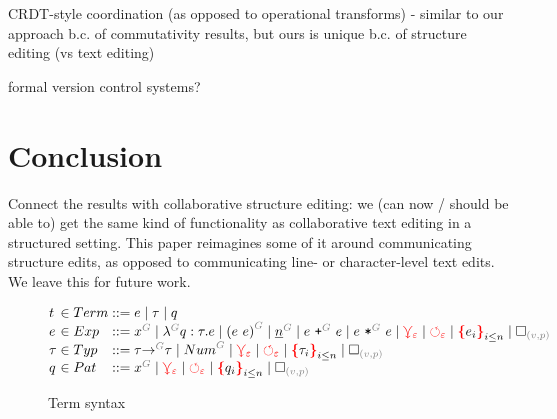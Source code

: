 \documentclass[nonacm, acmsmall, screen, review]{acmart}
\newcommand{\e}{\varepsilon}
\newcommand{\id}[1]{\textcolor{gray}{\ensuremath{#1}}}
\newcommand{\eid}[2]{{#2}^{\id{#1}}}
\newcommand{\conflictHole}[1]{%
{\noexpandarg\StrSubstitute{#1}{,}{\textcolor{red}{\,\textbf{|}\,}}[\myargs]%
{\textcolor{red}{\textbf{\{}}\myargs\textcolor{red}{\textbf{\}}}}}}%
\newcommand{\emptyHole}[2]{\square_{\id{(#1, #2)}}}
\newcommand{\eVar}[2]{\eid{#1}{#2}}
\newcommand{\eFun}[4]{\eid{#1}{\lambda} #2 : #3 . #4}
\newcommand{\eApp}[3]{\eid{#1}{\left(#2~#3\right)}}
\newcommand{\eNum}[2]{\eid{#1}{\underline{#2}}}
\newcommand{\ePlus}[3]{#2~\eid{#1}{\texttt{+}}~#3}
\newcommand{\eTimes}[3]{#2~\eid{#1}{\texttt{*}}~#3}
\newcommand{\pVar}[2]{\eid{#1}{#2}}
\newcommand{\tArrow}[3]{#2 \eid{#1}{\rightarrow} #3}
\newcommand{\tNum}[1]{\eid{#1}{Num}}
\newcommand{\multiVertex}[1]{\textcolor{red}{\ensuremath{\curlyveedownarrow_{#1}}}}
\newcommand{\cycleVertex}[1]{\textcolor{red}{\ensuremath{\circlearrowleft_{#1}}}}
\begin{document}
CRDT-style coordination (as opposed to operational transforms)
- similar to our approach b.c. of commutativity results, but ours is unique b.c. of structure editing (vs text editing)

formal version control systems?


\section{Conclusion}

Connect the results with collaborative structure editing: we (can now / should be able to) get the same kind of functionality as collaborative text editing in a structured setting. 
This paper reimagines some of it around communicating structure edits, as opposed to communicating line- or character-level text edits.
We leave this for future work.



\begin{figure}
  \[
    \arraycolsep=0pt
    \begin{array}{lcllll}
      t & {}\in{} & Term & {}::={} &
        e
        \mid \tau
        \mid q
      \\
      e & {}\in{} & Exp & {}::={} &
        \eVar{G}{x}
        \mid \eFun{G}{q}{\tau}{e}
        \mid \eApp{G}{e}{e}
        \mid \eNum{G}{n}
        \mid \ePlus{G}{e}{e}
        \mid \eTimes{G}{e}{e}
        \mid \multiVertex{\e}
        \mid \cycleVertex{\e}
        \mid \conflictHole{e_i}_{i \leq n}
        \mid \emptyHole{v}{p}
      \\
      \tau & {}\in{} & Typ & {}::={} &
        \tArrow{G}{\tau}{\tau}
        \mid \tNum{G}
        \mid \multiVertex{\e}
        \mid \cycleVertex{\e}
        \mid \conflictHole{\tau_i}_{i \leq n}
        \mid \emptyHole{v}{p}
      \\
      q & {}\in{} & Pat{} & {}::={} &
        \pVar{G}{x}
        \mid \multiVertex{\e}
        \mid \cycleVertex{\e}
        \mid \conflictHole{q_i}_{i \leq n}
        \mid \emptyHole{v}{p}
      \\
    \end{array}
  \]  
  \caption{Term syntax}
  \label{fig:Term syntax}
\end{figure}%



\end{document}
